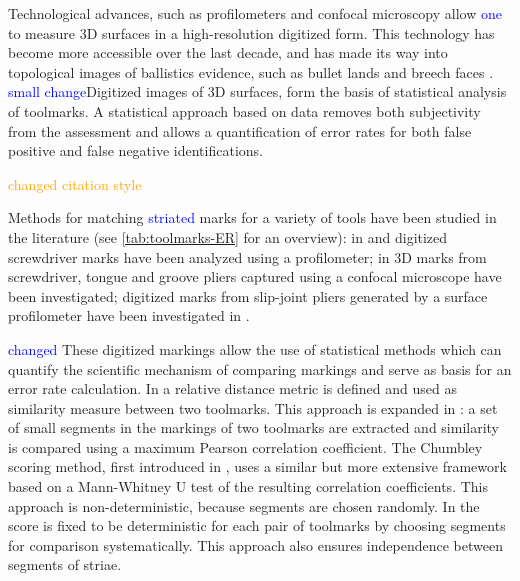 \documentclass[12pt]{article}
\begin{document}
Technological advances, such as profilometers and confocal microscopy
allow {\textcolor{blue}{one}} to measure 3D surfaces in a
high-resolution digitized form. This technology has become more
accessible over the last decade, and has made its way into topological
images of ballistics evidence, such as bullet lands and breech faces
\cite{DeKinder1, DeKinder2, Bachrach1, vorburger2016}.
{\textcolor{blue}{small change}}Digitized images of 3D surfaces, form
the basis of statistical analysis of toolmarks. A statistical approach
based on data removes both subjectivity from the assessment and allows a
quantification of error rates for both false positive and false negative
identifications.

{\textcolor{orange}{changed citation style}}

Methods for matching {\textcolor{blue}{striated}} marks for a variety of
tools have been studied in the literature (see
\autoref{tab:toolmarks-ER} for an overview): in \cite{manytoolmarks1}
and \cite{chumbley} digitized screwdriver marks have been analyzed using
a profilometer; in \cite{manytoolmarks2} 3D marks from screwdriver,
tongue and groove pliers captured using a confocal microscope have been
investigated; digitized marks from slip-joint pliers generated by a
surface profilometer have been investigated in \cite{afte-chumbley}.

{\textcolor{blue}{changed}} These digitized markings allow the use of
statistical methods which can quantify the scientific mechanism of
comparing markings and serve as basis for an error rate calculation. In
\cite{manytoolmarks2} a relative distance metric is defined and used as
similarity measure between two toolmarks. This approach is expanded in
\citet{manytoolmarks1}: a set of small segments in the markings of two
toolmarks are extracted and similarity is compared using a maximum
Pearson correlation coefficient. The Chumbley scoring method, first
introduced in \cite{chumbley}, uses a similar but more extensive
framework based on a Mann-Whitney U test of the resulting correlation
coefficients. This approach is non-deterministic, because segments are
chosen randomly. In \cite{hadler} the score is fixed to be deterministic
for each pair of toolmarks by choosing segments for comparison
systematically. This approach also ensures independence between segments
of striae.
\end{document}
